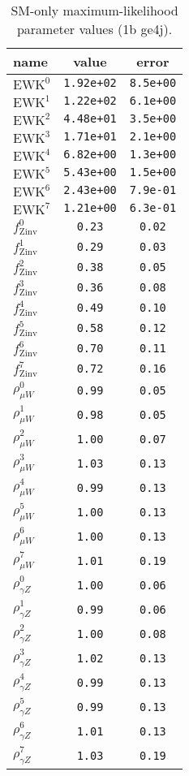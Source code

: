 %

\begin{table}\centering
\caption{SM-only maximum-likelihood parameter values (1b ge4j).}
\label{tab:mlParameterValues1b_ge4j}
\begin{tabular}{lcc}name & value & error \\ \hline
$\mathrm{EWK}^{0}$ & {\tt  1.92e+02} & {\tt  8.5e+00}\\
$\mathrm{EWK}^{1}$ & {\tt  1.22e+02} & {\tt  6.1e+00}\\
$\mathrm{EWK}^{2}$ & {\tt  4.48e+01} & {\tt  3.5e+00}\\
$\mathrm{EWK}^{3}$ & {\tt  1.71e+01} & {\tt  2.1e+00}\\
$\mathrm{EWK}^{4}$ & {\tt  6.82e+00} & {\tt  1.3e+00}\\
$\mathrm{EWK}^{5}$ & {\tt  5.43e+00} & {\tt  1.5e+00}\\
$\mathrm{EWK}^{6}$ & {\tt  2.43e+00} & {\tt  7.9e-01}\\
$\mathrm{EWK}^{7}$ & {\tt  1.21e+00} & {\tt  6.3e-01}\\
$f_\mathrm{Zinv}^{0}$ & {\tt 0.23} & {\tt 0.02}\\
$f_\mathrm{Zinv}^{1}$ & {\tt 0.29} & {\tt 0.03}\\
$f_\mathrm{Zinv}^{2}$ & {\tt 0.38} & {\tt 0.05}\\
$f_\mathrm{Zinv}^{3}$ & {\tt 0.36} & {\tt 0.08}\\
$f_\mathrm{Zinv}^{4}$ & {\tt 0.49} & {\tt 0.10}\\
$f_\mathrm{Zinv}^{5}$ & {\tt 0.58} & {\tt 0.12}\\
$f_\mathrm{Zinv}^{6}$ & {\tt 0.70} & {\tt 0.11}\\
$f_\mathrm{Zinv}^{7}$ & {\tt 0.72} & {\tt 0.16}\\
$\rho_{\mu W}^{0}$ & {\tt 0.99} & {\tt 0.05}\\
$\rho_{\mu W}^{1}$ & {\tt 0.98} & {\tt 0.05}\\
$\rho_{\mu W}^{2}$ & {\tt 1.00} & {\tt 0.07}\\
$\rho_{\mu W}^{3}$ & {\tt 1.03} & {\tt 0.13}\\
$\rho_{\mu W}^{4}$ & {\tt 0.99} & {\tt 0.13}\\
$\rho_{\mu W}^{5}$ & {\tt 1.00} & {\tt 0.13}\\
$\rho_{\mu W}^{6}$ & {\tt 1.00} & {\tt 0.13}\\
$\rho_{\mu W}^{7}$ & {\tt 1.01} & {\tt 0.19}\\
$\rho_{\gamma Z}^{0}$ & {\tt 1.00} & {\tt 0.06}\\
$\rho_{\gamma Z}^{1}$ & {\tt 0.99} & {\tt 0.06}\\
$\rho_{\gamma Z}^{2}$ & {\tt 1.00} & {\tt 0.08}\\
$\rho_{\gamma Z}^{3}$ & {\tt 1.02} & {\tt 0.13}\\
$\rho_{\gamma Z}^{4}$ & {\tt 0.99} & {\tt 0.13}\\
$\rho_{\gamma Z}^{5}$ & {\tt 0.99} & {\tt 0.13}\\
$\rho_{\gamma Z}^{6}$ & {\tt 1.01} & {\tt 0.13}\\
$\rho_{\gamma Z}^{7}$ & {\tt 1.03} & {\tt 0.19}\\
\hline
\end{tabular}
\end{table}
%